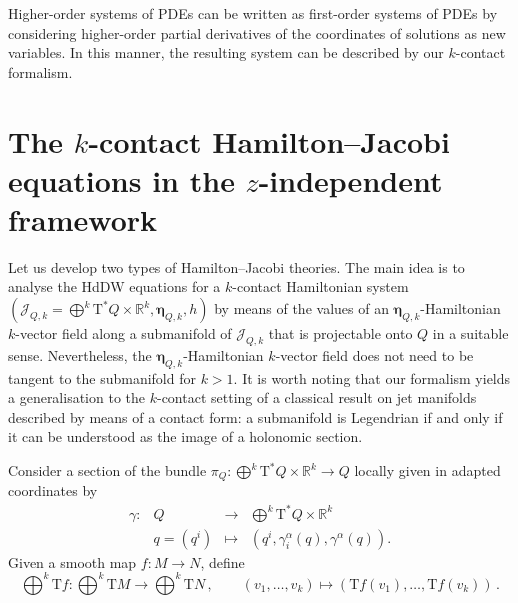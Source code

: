 \documentclass[11pt,twoside]{article}
\theoremstyle{plain}
\theoremstyle{definition}
\theoremstyle{remark}
\newcommand{\R}{\mathbb{R}}
\newcommand{\T}{\mathrm{T}}
\newcommand{\cT}{\mathrm{T}^\ast}
\begin{document}
Higher-order systems of PDEs can be written as first-order systems of PDEs by considering higher-order partial derivatives of the coordinates of solutions as new variables. In this manner, the resulting system can be described by our $k$-contact formalism.

\section{The \texorpdfstring{$k$}{}-contact Hamilton--Jacobi equations in the \texorpdfstring{$z$}{}-independent framework}
\label{sec:HJzindependent}



Let us develop two types of Hamilton--Jacobi theories. The main idea is to analyse the HdDW equations for a $k$-contact Hamiltonian system $(\mathcal{J}_{Q,k}=\bigoplus^k \T^*Q\times \R^k,\bm \eta_{Q,k},h)$ by means of the values of an ${\bm \eta}_{Q,k}$-Hamiltonian $k$-vector field along a submanifold of $\mathcal{J}_{Q,k}$ that is projectable onto $Q$ in a suitable sense. Nevertheless, the ${\bm \eta}_{Q,k}$-Hamiltonian $k$-vector field does not need to be tangent to the submanifold for $k>1$. It is worth noting that our formalism yields a generalisation to the $k$-contact setting of a classical result on jet manifolds described by means of a contact form: a submanifold is Legendrian if and only if it can be understood as the image of a  holonomic section.

Consider a section of the bundle \(
\pi_Q\colon \bigoplus\nolimits^k \cT Q \times \mathbb{R}^k \to Q
\) locally given in adapted coordinates by
\[
\begin{array}{rccl}
\gamma\colon & Q & \longrightarrow & \bigoplus\nolimits^k \cT Q \times \mathbb{R}^k \\
& q=(q^i) & \longmapsto & \left(q^i,\gamma_i^\alpha(q),\gamma^\alpha(q)\right).
\end{array}
\]
Given a smooth map $f\colon M\to N$, define
\[\textstyle
\bigoplus\nolimits^k \T f\colon \bigoplus\nolimits^k \T M \longrightarrow \bigoplus\nolimits^k \T N\,,
\qquad
(v_1,\dotsc,v_k)\longmapsto (\T f(v_1),\dotsc,\T f(v_k))\,.
\]
\end{document}

